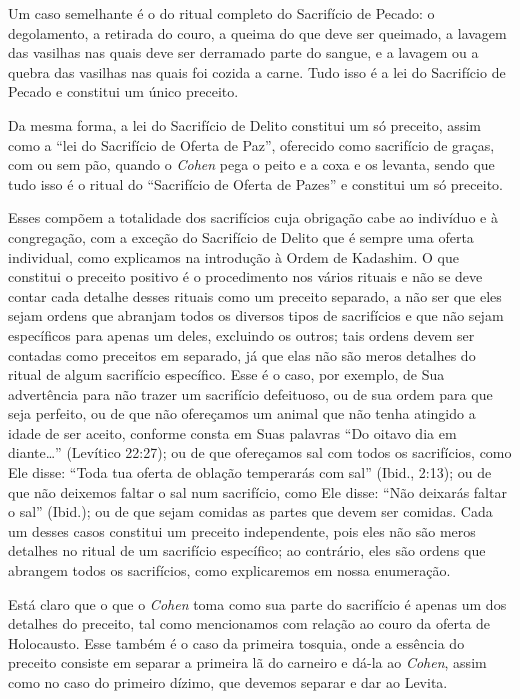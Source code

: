Um caso semelhante é o do ritual completo do Sacrifício de Pecado:
o degolamento, a retirada do couro, a queima do que deve ser queimado, a
lavagem das vasilhas nas quais deve ser derramado parte do sangue, e a
lavagem ou a quebra das vasilhas nas quais foi cozida a carne. Tudo
isso é a lei do Sacrifício de Pecado e constitui um único preceito.

Da mesma forma, a lei do Sacrifício de Delito constitui um só preceito,
assim como a ``lei do Sacrifício de Oferta de Paz'', oferecido como
sacrifício de graças, com ou sem pão, quando o \textit{Cohen} pega o peito e
a coxa e os levanta, sendo que tudo isso é o ritual do ``Sacrifício de
Oferta de Pazes'' e
constitui um só preceito.

Esses compõem a totalidade dos sacrifícios cuja obrigação cabe ao
indivíduo e à congregação, com a exceção do Sacrifício de Delito que é
sempre uma oferta individual, como explicamos na introdução à Ordem de
Kadashim.
O que constitui o preceito positivo é o procedimento nos vários rituais
e não se deve contar cada detalhe desses rituais como um preceito
separado, a não
ser que eles sejam ordens que abranjam todos os diversos tipos de
sacrifícios e que não sejam específicos para apenas um deles, excluindo
os outros; tais ordens devem ser contadas como preceitos em separado,
já que elas não são meros detalhes do ritual de algum sacrifício
específico. Esse é o caso, por exemplo, de Sua advertência para não
trazer um sacrifício defeituoso, ou de sua ordem para que seja
perfeito, ou de que não ofereçamos um animal que não tenha atingido a
idade de ser aceito, conforme consta em Suas palavras ``Do oitavo dia
em diante\ldots{}'' (Levítico 22:27); ou de que ofereçamos sal com todos os
sacrifícios, como Ele disse: ``Toda tua oferta de oblação temperarás com
sal'' (Ibid., 2:13); ou de que não deixemos faltar o sal num sacrifício,
como Ele disse: ``Não deixarás faltar o sal'' (Ibid.); ou de que sejam
comidas as partes que devem ser comidas. Cada um desses casos constitui
um preceito independente, pois eles não são meros detalhes no ritual de
um sacrifício específico; ao contrário, eles são ordens que abrangem
todos os sacrifícios, como explicaremos em nossa enumeração.

Está claro que o que o \textit{Cohen} toma como sua parte do sacrifício é
apenas um dos detalhes do preceito, tal como mencionamos com relação ao
couro da oferta de Holocausto. Esse também é o caso da primeira tosquia,
onde a essência do preceito consiste em separar a primeira lã do
carneiro e dá-la ao \textit{Cohen}, assim como no caso do primeiro dízimo,
que devemos separar e dar ao Levita.

